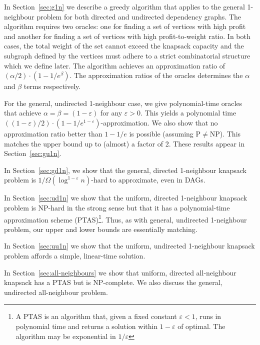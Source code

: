\documentclass[12pt]{article}
\begin{document}
In Section~\ref{sec:g1n} we describe a greedy algorithm that applies to the general 1-neighbour problem for both directed and undirected dependency graphs.  The algorithm requires two oracles: one for finding a set of vertices with high profit and another for finding a set of vertices with high profit-to-weight ratio.  In both cases, the total weight of the set cannot exceed the knapsack capacity and the subgraph defined by the vertices must adhere to a strict combinatorial structure which we define later.   The algorithm achieves an approximation ratio of $(\alpha/2) \cdot (1-1/e^{\beta})$.  The approximation ratios of the oracles determines the $\alpha$ and $\beta$ terms respectively.

For the general, undirected 1-neighbour case, we give polynomial-time oracles that achieve $\alpha = \beta = (1-\varepsilon)$ for any $\varepsilon > 0$.  This yields a polynomial time $((1-\varepsilon)/2) \cdot (1-1/e^{1-\varepsilon})$-approximation.  We also show that no approximation ratio better than $1-1/e$ is possible (assuming P$\not=$NP).  This matches the upper bound up to (almost) a factor of 2.  These results appear in Section~\ref{sec:gu1n}.

In Section~\ref{sec:gd1n}, we show that the general, directed 1-neighbour knapsack problem is $1/ \Omega(\log^{1-\varepsilon} n)$-hard to approximate, even in DAGs.  

In Section~\ref{sec:ud1n} we show that the uniform, directed
1-neighbour knapsack problem is NP-hard in the strong sense but that it has a polynomial-time
approximation scheme (PTAS)\footnote{A PTAS is an algorithm that,
given a fixed constant $\varepsilon < 1$, runs in polynomial time and
returns a solution within $1-\varepsilon$ of optimal.  The algorithm
may be exponential in $1/\varepsilon$}.  Thus, as with general, undirected 1-neighbour problem, our upper and lower bounds are essentially matching.

In Section~\ref{sec:uu1n} we show that the uniform, undirected
1-neighbour knapsack problem affords a simple, linear-time solution.

In Section~\ref{sec:all-neighbours} we show that uniform, directed
all-neighbour knapsack has a PTAS but is NP-complete.  We also discuss the general, undirected all-neighbour problem.
\end{document}
